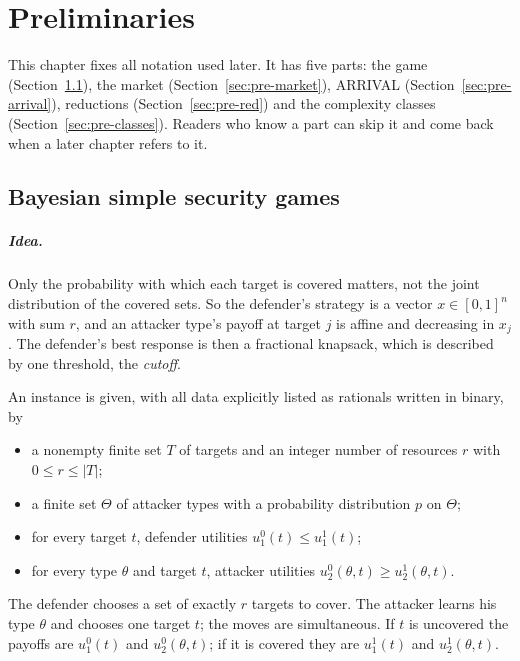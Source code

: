 \chapter{Preliminaries}\label{ch:prelim}

This chapter fixes all notation used later. It has five parts: the game
(Section~\ref{sec:pre-game}), the market (Section~\ref{sec:pre-market}), ARRIVAL
(Section~\ref{sec:pre-arrival}), reductions (Section~\ref{sec:pre-red}) and the complexity classes
(Section~\ref{sec:pre-classes}). Readers who know a part can skip it and come back when a later chapter
refers to it.

\section{Bayesian simple security games}\label{sec:pre-game}

\paragraph{Idea.} Only the probability with which each target is covered matters, not the joint
distribution of the covered sets. So the defender's strategy is a vector $x\in[0,1]^n$ with sum $r$, and
an attacker type's payoff at target $j$ is affine and decreasing in $x_j$. The defender's best response is
then a fractional knapsack, which is described by one threshold, the \emph{cutoff}.

\begin{definition}\label{def:game}
An instance is given, with all data explicitly listed as rationals written in binary, by
\begin{itemize}[nosep]
\item a nonempty finite set $T$ of targets and an integer number of resources $r$ with $0\le r\le|T|$;
\item a finite set $\Theta$ of attacker types with a probability distribution $p$ on $\Theta$;
\item for every target $t$, defender utilities $u_1^0(t)\le u_1^1(t)$;
\item for every type $\theta$ and target $t$, attacker utilities $u_2^0(\theta,t)\ge u_2^1(\theta,t)$.
\end{itemize}
The defender chooses a set of exactly $r$ targets to cover. The attacker learns his type $\theta$ and
chooses one target $t$; the moves are simultaneous. If $t$ is uncovered the payoffs are $u_1^0(t)$ and
$u_2^0(\theta,t)$; if it is covered they are $u_1^1(t)$ and $u_2^1(\theta,t)$.
\end{definition}

